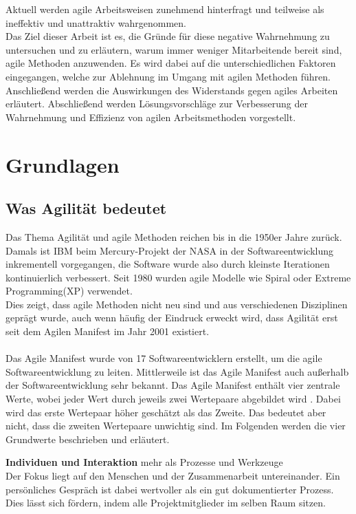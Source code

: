 \documentclass[ngerman]{seminarvorlage}
\begin{document}
Aktuell werden agile Arbeitsweisen zunehmend hinterfragt und teilweise als ineffektiv und unattraktiv wahrgenommen.\\
Das Ziel dieser Arbeit ist es, die Gründe für diese negative Wahrnehmung zu untersuchen und zu erläutern, warum immer weniger Mitarbeitende bereit sind, agile Methoden anzuwenden. Es wird dabei auf die unterschiedlichen Faktoren eingegangen, welche zur Ablehnung im Umgang mit agilen Methoden führen. Anschließend werden die Auswirkungen des Widerstands gegen agiles Arbeiten erläutert. Abschließend werden Lösungsvorschläge zur Verbesserung der Wahrnehmung und Effizienz von agilen Arbeitsmethoden vorgestellt.



\section{Grundlagen}
\subsection{Was Agilität bedeutet}
Das Thema Agilität und agile Methoden reichen bis in die 1950er Jahre zurück. Damals ist IBM beim Mercury-Projekt der NASA in der Softwareentwicklung inkrementell vorgegangen, die Software wurde also durch kleinste Iterationen kontinuierlich verbessert. Seit 1980 wurden agile Modelle wie Spiral oder Extreme Programming(XP) verwendet.\\
Dies zeigt, dass agile Methoden nicht neu sind und aus verschiedenen Disziplinen geprägt wurde, auch wenn häufig der Eindruck erweckt wird, dass Agilität erst seit dem Agilen Manifest im Jahr 2001 existiert.\\\\%
Das Agile Manifest wurde von 17 Softwareentwicklern erstellt, um die agile Softwareentwicklung zu leiten. Mittlerweile ist das Agile Manifest auch außerhalb der Softwareentwicklung sehr bekannt.
Das Agile Manifest enthält vier zentrale Werte, wobei jeder Wert durch jeweils zwei Wertepaare abgebildet wird . Dabei wird das erste Wertepaar höher geschätzt als das Zweite. Das bedeutet aber nicht, dass die zweiten Wertepaare unwichtig sind. Im Folgenden werden die vier Grundwerte beschrieben und erläutert.

\textbf{Individuen und Interaktion} mehr als Prozesse und Werkzeuge\\
Der Fokus liegt auf den Menschen und der Zusammenarbeit untereinander. Ein persönliches Gespräch ist dabei wertvoller als ein gut dokumentierter Prozess. Dies lässt sich fördern, indem alle Projektmitglieder im selben Raum sitzen.
\end{document}
